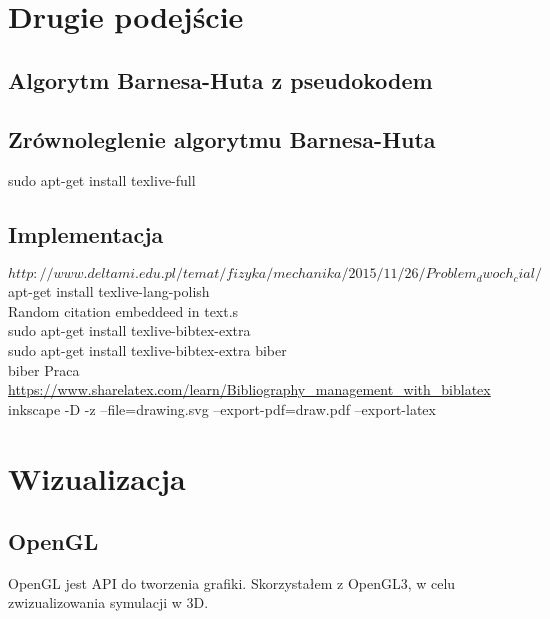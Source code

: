 \documentclass[14pt,twoside,a4paper]{article}
\begin{document}
\bigskip

\section{\LARGE Drugie podejście}

\bigskip

\subsection{\Large Algorytm Barnesa-Huta z pseudokodem}

\bigskip

\subsection{\Large Zrównoleglenie algorytmu Barnesa-Huta}

\bigskip
 sudo apt-get install texlive-full

\subsection{\Large Implementacja}

$http://www.deltami.edu.pl/temat/fizyka/mechanika/2015/11/26/Problem_dwoch_cial/$
\bigskip
apt-get install texlive-lang-polish\\
Random citation embeddeed in text.s\\
 sudo apt-get install texlive-bibtex-extra\\
 sudo apt-get install texlive-bibtex-extra biber\\
biber Praca\\
\url{https://www.sharelatex.com/learn/Bibliography_management_with_biblatex}\\
inkscape -D -z --file=drawing.svg --export-pdf=draw.pdf --export-latex

\section{\LARGE Wizualizacja}

\subsection{\large OpenGL}
OpenGL jest API do tworzenia grafiki. Skorzystałem z OpenGL3, w celu zwizualizowania symulacji w 3D.
\end{document}
